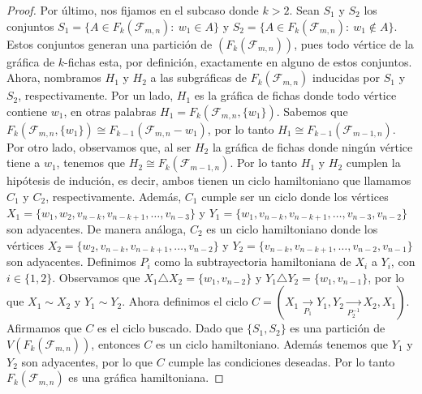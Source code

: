 \begin{proof}
    Por \'ultimo, nos fijamos en el subcaso donde $k>2$. Sean $S_1$ y $S_2$ los
    conjuntos $S_1=\{A \in F_k(\mathcal{F}_{m,n}) \colon\ w_1 \in A\}$ y
    $S_2=\{A \in F_k(\mathcal{F}_{m,n}) \colon\ w_1 \notin A\}$. Estos conjuntos
    generan una partici\'on de $(F_k(\mathcal{F}_{m,n}))$, pues todo v\'ertice
    de la gr\'afica de $k$-fichas esta, por definici\'on, exactamente en alguno
    de estos conjuntos. Ahora, nombramos $H_1$ y $H_2$ a las subgr\'aficas de
    $F_k(\mathcal{F}_{m,n})$ inducidas por $S_1$ y $S_2$, respectivamente. Por
    un lado, $H_1$ es la gr\'afica de fichas donde todo v\'ertice contiene
    $w_1$, en otras palabras $H_1= F_k(\mathcal{F}_{m,n},\{w_1\})$. Sabemos que
    $F_k(\mathcal{F}_{m,n},\{w_1\}) \cong F_{k-1}(\mathcal{F}_{m,n}- w_1)$, por
    lo tanto $H_1 \cong F_{k-1}(\mathcal{F}_{m-1,n})$. Por otro lado, observamos
    que, al ser $H_2$ la gr\'afica de fichas donde ning\'un v\'ertice tiene a
    $w_1$, tenemos que $H_2 \cong F_k(\mathcal{F}_{m-1,n})$. Por lo tanto $H_1$
    y $H_2$ cumplen la hip\'otesis de induci\'on, es decir, ambos tienen un
    ciclo hamiltoniano que llamamos $C_1$ y $C_2$, respectivamente. Adem\'as,
    $C_1$ cumple ser un ciclo donde los v\'ertices $X_1 = \{w_1,
    w_2,v_{n-k},v_{n-k+1}, \dots, v_{n-3}\}$ y $Y_1 = \{w_1,v_{n-k},v_{n-k+1},
    \dots, v_{n-3},v_{n-2}\}$ son adyacentes. De manera an\'aloga, $C_2$ es un
    ciclo hamiltoniano donde los v\'ertices $X_2 = \{ w_2,v_{n-k},v_{n-k+1},
    \dots, v_{n-2}\}$ y $Y_2 = \{v_{n-k},v_{n-k+1}, \dots, v_{n-2},v_{n-1}\}$
    son adyacentes. Definimos $P_i$ como la subtrayectoria hamiltoniana de $X_i$
    a $Y_i$, con $i \in \{ 1,2 \}$. Observamos que $X_1 \triangle X_2 =
    \{w_1,v_{n-2}\}$ y $Y_1 \triangle Y_2 = \{w_1, v_{n-1}\}$, por lo que $X_1
    \sim X_2$ y $Y_1 \sim Y_2$. Ahora definimos el ciclo $C = (X_1
    \xrightarrow[P_1]{}Y_1,Y_2 \xrightarrow[P_2^{-1}]{}X_2,X_1)$. Afirmamos que
    $C$ es el ciclo buscado. Dado que $\{S_1,S_2\}$ es una partici\'on de
    $V(F_k(\mathcal{F}_{m,n}))$, entonces $C$ es un ciclo hamiltoniano. Adem\'as
    tenemos que $Y_1$ y $Y_2$ son adyacentes, por lo que $C$ cumple las
    condiciones deseadas. Por lo tanto $F_k(\mathcal{F}_{m,n})$ es una gr\'afica
    hamiltoniana.
\end{proof}

